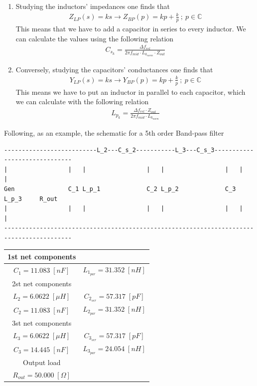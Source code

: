 \documentclass[a4paper,12pt]{report}
\begin{document}
\begin{enumerate}
	\item Studying the inductors' impedances one finds that
	\begin{align}
		Z_{LP}(s) = ks \rightarrow Z_{BP}(p) = kp + \frac{k}{p} \ ; \ p \in \mathbb{C}
	\end{align}
	This means that we have to add a capacitor in series to every inductor.  
	We can calculate the values using the following relation
	\begin{align}
		C_{s_k} = \frac{\Delta f_{rel}}{2\pi f_{mid} \cdot L_{k_{norm}} \cdot Z_{out}}
	\end{align}
	\item Conversely, studying the capacitors' conductances one finds that
	\begin{align}
		Y_{LP}(s) = ks \rightarrow Y_{BP}(p) = kp + \frac{k}{p} \ ; \ p \in \mathbb{C}
	\end{align}
	This means we have to put an inductor in parallel to each capacitor, which we can calculate with the following relation
	\begin{align}
		L_{p_k} = \frac{\Delta f_{rel} \cdot Z_{out}}{2\pi f_{mid} \cdot L_{k_{norm}}}
	\end{align}
\end{enumerate}
Following, as an example, the schematic for a 5th order Band-pass filter
\begin{verbatim}
--------------------------L_2---C_s_2-----------L_3---C_s_3------------------------------
|                 |   |                 |   |                 |   |         |
Gen               C_1 L_p_1             C_2 L_p_2             C_3 L_p_3     R_out
|                 |   |                 |   |                 |   |         |
-----------------------------------------------------------------------------------------
\end{verbatim}

\begin{center}
	\begin{tabular}{||c c||} 
	\hline
	1st net components &\\ [0.5ex] 
	\hline
	 $C_1 = 11.083 \;[nF]$ & $L_{1_{par}} = 31.352\;[nH]$\\ 
	\hline\hline
	2st net components &\\ [0.5ex] 
	\hline
	$L_2 = 6.0622\; [\mu H]$ & $C_{2_{ser}} = 57.317 \;[pF]$\\
	$C_2 = 11.083\; [nF]$ & $L_{2_{par}} = 31.352\; [nH]$\\
	\hline\hline
	3st net components &\\ [0.5ex] 
	\hline
	$L_3 = 6.0622\; [\mu H]$ & $C_{3_{ser}} = 57.317 \;[pF]$\\
	$C_3 = 14.445\; [nF]$ & $L_{3_{par}} = 24.054\; [nH]$\\
	\hline\hline
	Output load &\\ [0.5ex] 
	\hline
	$R_{out} = 50.000 \;[\Omega]$ &\\ 
	\hline\hline
\end{tabular}
\end{center}




\end{document}
